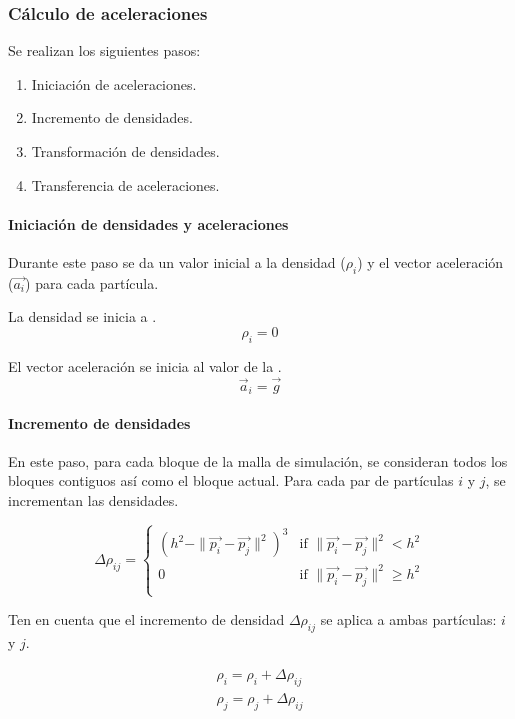 \subsubsection{Cálculo de aceleraciones}

Se realizan los siguientes pasos:

\begin{enumerate}
\item Iniciación de aceleraciones.
\item Incremento de densidades.
\item Transformación de densidades.
\item Transferencia de aceleraciones.
\end{enumerate}

\paragraph{Iniciación de densidades y aceleraciones}
Durante este paso se da un valor inicial a la densidad ($\rho_i$)
y el vector aceleración ($\vec{a_i}$) para cada partícula.

La densidad se inicia a .
\[
\rho_i = 0
\]

El vector aceleración se inicia al valor de la .
\[
\vec{a}_i = \vec{g}
\]

\paragraph{Incremento de densidades}
En este paso, para cada bloque de la malla de simulación, se consideran todos 
los bloques contiguos así como el bloque actual. Para cada par de partículas
$i$ y $j$, se incrementan las densidades.

\[
\Delta \rho_{ij} = 
    \begin{cases}
      (h^2 - \|\vec{p_i} - \vec{p_j}\|^2)^3 & 
          \text{if  } \|\vec{p_i} - \vec{p_j}\|^2 < h^2\\
      0 & 
          \text{if  } \|\vec{p_i} - \vec{p_j}\|^2 \geq h^2\\
    \end{cases}
\]

Ten en cuenta que el incremento de densidad $\Delta \rho_{ij}$ se aplica a ambas
partículas: $i$ y $j$.

\[
\begin{split}
\rho_i = \rho_i + \Delta \rho_{ij}\\
\rho_j = \rho_j + \Delta \rho_{ij}\\
\end{split}
\]

